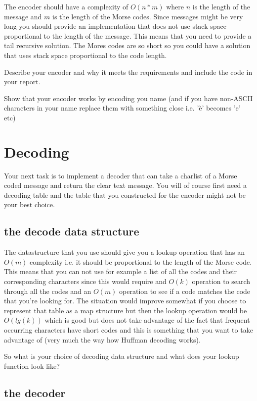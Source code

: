\documentclass[a4paper,11pt]{article}
\begin{document}
The encoder should have a complexity of $O(n * m)$ where $n$ is the
length of the message and $m$ is the length of the Morse codes. Since
messages might be very long you should provide an implementation that
does not use stack space proportional to the length of the
message. This means that you need to provide a tail recursive
solution. The Mores codes are so short so you could have a solution
that uses stack space proportional to the code length. 

Describe your encoder and why it meets the requirements and include
the code in your report.

Show that your encoder works by encoding you name (and if you have
non-ASCII characters in your name replace them with something close
i.e. 'è' becomes 'e' etc)

\section*{Decoding}

Your next task is to implement a decoder that can take a charlist of a
Morse coded message and return the clear text message. You will of
course first need a decoding table and the table that you constructed
for the encoder might not be your best choice.

\subsection*{the decode data structure}

The datastructure that you use should give you a lookup operation that
has an $O(m)$ complexity i.e. it should be proportional to the length
of the Morse code. This means that you can not use for example a list
of all the codes and their corresponding characters since this would
require and $O(k)$ operation to search through all the codes and an
$O(m)$ operation to see if a code matches the code that you're looking
for. The situation would improve somewhat if you choose to represent
that table as a map structure but then the lookup operation would be
$O(lg(k))$ which is good but does not take advantage of the fact that
frequent occurring characters have short codes and this is something
that you want to take advantage of (very much the way how Huffman decoding
works).

So what is your choice of decoding data structure and what does your lookup
function look like?

\subsection*{the decoder}
\end{document}
